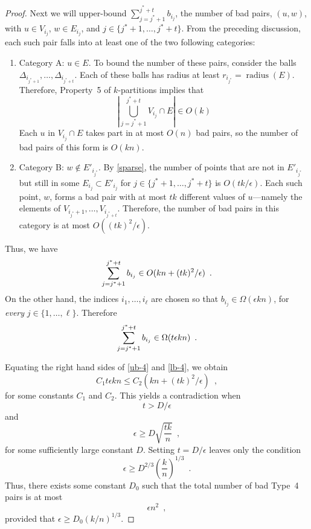 \documentclass{patmorin}
\DeclareMathOperator{\radius}{radius}
\begin{document}
\begin{proof}
  Next we will upper-bound $\sum_{j=j^*+1}^{j^*+t}b_{i_j}$, the number
  of bad pairs, $(u,w)$, with $u\in V_{i_j}$, $w\in E_{i_j}$, and
  $j\in\{j^*+1,\ldots,j^*+t\}$.  From the preceding discussion, each such
  pair falls into at least one of the two following categories:
  \begin{enumerate}
    \item Category A: $u\in E$. 
      To bound the number of these pairs, consider the balls
      $\Delta_{i_{j^*+1}},\ldots,\Delta_{i_{j^*+t}}$. Each of these
      balls has radius at least $r_{i_{j^*}}=\radius(E)$.  Therefore,
      Property~5 of $k$-partitions implies that
      \[
        \left|\bigcup_{j=j^*+1}^{j^*+t} V_{i_{j}}\cap E\right|
          \in O(k)
      \]
      Each $u$ in $V_{i_j}\cap E$ takes part in at most $O(n)$ bad pairs,
      so the number of bad pairs of this form is $O(kn)$.

    \item Category B: $w\not\in E'_{i_{j^*}}$.
      By \eqref{sparse}, the number of points that are not in
      $E'_{i_{j^*}}$ but still in some $E_{i_j}\subset E'_{i_j}$
      for $j\in\{j^*+1,\ldots,j^*+t\}$ is $O(tk/\epsilon)$.
      Each such point, $w$, forms a bad pair with at most
      $tk$ different values of $u$---namely the elements of
      $V_{i_{j^*}+1},\ldots,V_{i_{j^*+t}}$. Therefore, the number of
      bad pairs in this category is at most $O((tk)^2/\epsilon)$.
  \end{enumerate}
  Thus, we have 
  \begin{equation}
    \sum_{j=j^*+1}^{j^*+t} b_{i_{j}}  \in O(kn + (tk)^2/\epsilon) \enspace .
    \eqlabel{ub-4}
  \end{equation}
  On the other hand, the indices $i_1,\ldots,i_\ell$ are chosen
  so that $b_{i_j}\in\Omega(\epsilon kn)$, for \emph{every}
  $j\in\{1,\ldots,\ell\}$.  Therefore
  \begin{equation}
    \sum_{j=j^*+1}^{j^*+t} b_{i_{j}} 
        \in \Omega(t\epsilon kn) \enspace .
        \eqlabel{lb-4}
  \end{equation}
 
  Equating the right hand sides of \eqref{ub-4} and \eqref{lb-4}, we
  obtain 
  \[
     C_1t\epsilon kn \le C_2(kn + (tk)^2/\epsilon) \enspace , 
  \]
  for some constants $C_1$ and $C_2$.  This yields a contradiction when 
  \[
      t > D/\epsilon
  \]
  and
  \[
          \epsilon\ge D\sqrt{\frac{tk}{n}} \enspace ,
  \]
  for some sufficiently large constant $D$.  Setting $t=D/\epsilon$
  leaves only the condition
  \[
          \epsilon \ge D^{2/3}\left(\frac{k}{n}\right)^{1/3} \enspace .
  \]
  Thus, there exists some constant $D_0$ such that the total number of
  bad Type~4 pairs is at most
  \[
    \epsilon n^2 \enspace ,
  \]
  provided that $\epsilon \ge D_0(k/n)^{1/3}$. 


\end{proof}
\end{document}
